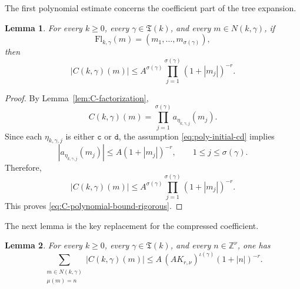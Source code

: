 \documentclass[12pt,reqno,tbtags]{amsart}
\newtheorem{lemma}{Lemma}[section]
\newcommand\1{\mathbbm{1}}
\begin{document}
The first polynomial estimate concerns the coefficient part of the tree expansion.

\begin{lemma}\label{lem:C-polynomial-bound-rigorous}
For every $k\ge0$, every $\gamma\in\mathfrak T(k)$, and every
$m\in N(k,\gamma)$, if
\[
\mathrm{Fl}_{k,\gamma}(m)=(m_1,\dots,m_{\sigma(\gamma)}),
\]
then
\begin{equation}\label{eq:C-polynomial-bound-rigorous}
|C(k,\gamma)(m)|
\le
A^{\sigma(\gamma)}
\prod_{j=1}^{\sigma(\gamma)}(1+|m_j|)^{-r}.
\end{equation}
\end{lemma}

\begin{proof}
By Lemma~\ref{lem:C-factorization},
\[
C(k,\gamma)(m)
=
\prod_{j=1}^{\sigma(\gamma)}
a_{\eta_{k,\gamma,j}}(m_j).
\]
Since each $\eta_{k,\gamma,j}$ is either $\mathtt c$ or $\mathtt d$, the assumption
\eqref{eq:poly-initial-cd} implies
\[
|a_{\eta_{k,\gamma,j}}(m_j)|
\le
A(1+|m_j|)^{-r},
\qquad
1\le j\le \sigma(\gamma).
\]
Therefore,
\[
|C(k,\gamma)(m)|
\le
A^{\sigma(\gamma)}
\prod_{j=1}^{\sigma(\gamma)}(1+|m_j|)^{-r}.
\]
This proves \eqref{eq:C-polynomial-bound-rigorous}.
\end{proof}

The next lemma is the key replacement for the compressed coefficient.

\begin{lemma}\label{lem:sum-C-polynomial-bound}
For every $k\ge0$, every $\gamma\in\mathfrak T(k)$, and every $n\in\mathbb Z^\nu$,
one has
\begin{equation}\label{eq:sum-C-polynomial-bound}
\sum_{\substack{m\in N(k,\gamma)\\ \mu(m)=n}}
|C(k,\gamma)(m)|
\le
A\,(A K_{r,\nu})^{\iota(\gamma)}(1+|n|)^{-r}.
\end{equation}
\end{lemma}
\end{document}

